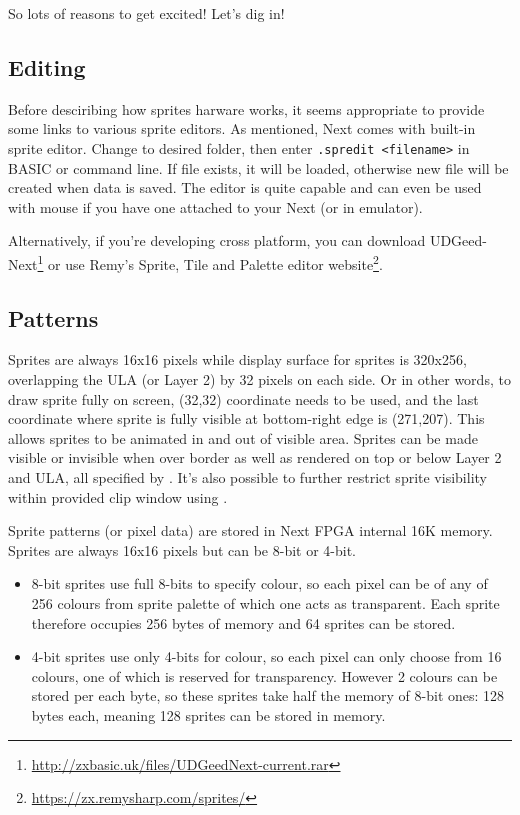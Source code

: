 \documentclass[12pt,twoside,openright,a4paper]{book}
\begin{document}
So lots of reasons to get excited! Let's dig in!

\subsection{Editing}

Before desciribing how sprites harware works, it seems appropriate to provide some links to various sprite editors. As mentioned, Next comes with built-in sprite editor. Change to desired folder, then enter {\tt .spredit <filename>} in BASIC or command line. If file exists, it will be loaded, otherwise new file will be created when data is saved. The editor is quite capable and can even be used with mouse if you have one attached to your Next (or in emulator).

Alternatively, if you're developing cross platform, you can download UDGeed-Next\footnote{\url{http://zxbasic.uk/files/UDGeedNext-current.rar}} or use Remy's Sprite, Tile and Palette editor website\footnote{\url{https://zx.remysharp.com/sprites/}}.


\subsection{Patterns}

Sprites are always 16x16 pixels while display surface for sprites is 320x256, overlapping the ULA (or Layer 2) by 32 pixels on each side. Or in other words, to draw sprite fully on screen, (32,32) coordinate needs to be used, and the last coordinate where sprite is fully visible at bottom-right edge is (271,207). This allows sprites to be animated in and out of visible area. Sprites can be made visible or invisible when over border as well as rendered on top or below Layer 2 and ULA, all specified by . It's also possible to further restrict sprite visibility within provided clip window using .

Sprite patterns (or pixel data) are stored in Next FPGA internal 16K memory. Sprites are always 16x16 pixels but can be 8-bit or 4-bit.

\begin{itemize}[topsep=1pt,itemsep=1pt]
	\item 8-bit sprites use full 8-bits to specify colour, so each pixel can be of any of 256 colours from sprite palette of which one acts as transparent. Each sprite therefore occupies 256 bytes of memory and 64 sprites can be stored.

	\item 4-bit sprites use only 4-bits for colour, so each pixel can only choose from 16 colours, one of which is reserved for transparency. However 2 colours can be stored per each byte, so these sprites take half the memory of 8-bit ones: 128 bytes each, meaning 128 sprites can be stored in memory.
\end{itemize}
\end{document}

